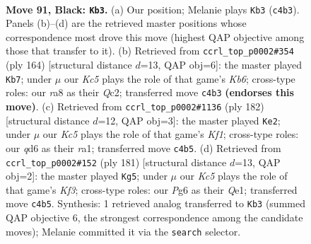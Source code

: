 \documentclass[11pt]{article}
\begin{document}
\clearpage

\begin{figure}[p]\centering
\begin{subfigure}{0.46\textwidth}\centering
\resizebox{\linewidth}{!}{%
\newchessgame
\chessboard[
  setfen={R7/8/3Q2p1/5p2/2k2P2/8/6K1/8 b - - 2 91},
  showmover=false,
  pgfstyle=straightmove, color=movearrow, markmove={c4-b3}
]}
\caption{}
\end{subfigure}\hfill
\begin{subfigure}{0.46\textwidth}\centering
\resizebox{\linewidth}{!}{%
\newchessgame
\chessboard[
  setfen={6k1/8/1K5p/6p1/6P1/4q2P/2Q5/8 w - - 15 83},
  showmover=false,
  pgfstyle=straightmove, color=movearrow, markmove={b6-b7}
]}
\caption{}
\end{subfigure}
\\[4pt]
\begin{subfigure}{0.46\textwidth}\centering
\resizebox{\linewidth}{!}{%
\newchessgame
\chessboard[
  setfen={3R4/8/7k/6p1/6P1/5P2/8/r4K2 w - - 83 92},
  showmover=false,
  pgfstyle=straightmove, color=movearrow, markmove={f1-e2}
]}
\caption{}
\end{subfigure}\hfill
\begin{subfigure}{0.46\textwidth}\centering
\resizebox{\linewidth}{!}{%
\newchessgame
\chessboard[
  setfen={8/8/K4kp1/8/8/1P3Q2/8/4q3 b - - 17 91},
  showmover=false,
  pgfstyle=straightmove, color=movearrow, markmove={f6-g5}
]}
\caption{}
\end{subfigure}
\caption{\textbf{Move 91, Black: \texttt{Kb3}.} (a) Our position; Melanie plays \texttt{Kb3} (\texttt{c4b3}). Panels (b)--(d) are the retrieved master positions whose correspondence most drove this move (highest QAP objective among those that transfer to it). (b) Retrieved from \texttt{ccrl\_top\_p0002\#354} (ply 164) [structural distance $d$=13, QAP obj=6]: the master played \texttt{Kb7}; under $\mu$ our \emph{Kc5} plays the role of that game's \emph{Kb6}; cross-type roles: our \emph{r}a8 as their \emph{Q}c2; transferred move \texttt{c4b3} \textbf{(endorses this move)}. (c) Retrieved from \texttt{ccrl\_top\_p0002\#1136} (ply 182) [structural distance $d$=12, QAP obj=3]: the master played \texttt{Ke2}; under $\mu$ our \emph{Kc5} plays the role of that game's \emph{Kf1}; cross-type roles: our \emph{q}d6 as their \emph{r}a1; transferred move \texttt{c4b5}. (d) Retrieved from \texttt{ccrl\_top\_p0002\#152} (ply 181) [structural distance $d$=13, QAP obj=2]: the master played \texttt{Kg5}; under $\mu$ our \emph{Kc5} plays the role of that game's \emph{Kf3}; cross-type roles: our \emph{P}g6 as their \emph{Q}e1; transferred move \texttt{c4b5}. Synthesis: 1 retrieved analog transferred to \texttt{Kb3} (summed QAP objective 6, the strongest correspondence among the candidate moves); Melanie committed it via the \texttt{search} selector.}
\label{fig:thought-m181}
\end{figure}
\end{document}
